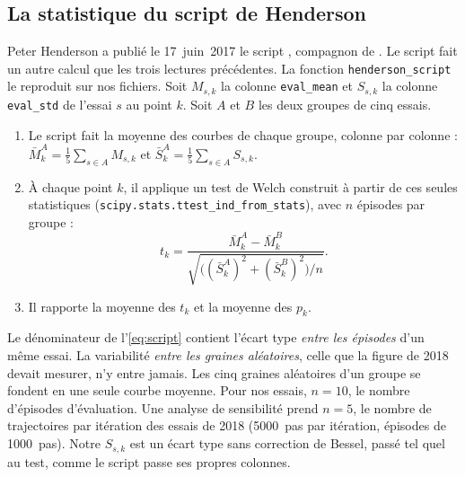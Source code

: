 \subsection{La statistique du script de Henderson}\label{sec:script-henderson}
Peter Henderson a publié le 17~juin~2017 le script 
\parencite{henderson2017samedist}, compagnon de \textcite{islam2017reproducibility}. Le script fait un autre
calcul que les trois lectures précédentes. La fonction \texttt{henderson\_script} le reproduit sur nos
fichiers. Soit $M_{s,k}$ la colonne \texttt{eval\_mean} et $S_{s,k}$ la colonne \texttt{eval\_std} de
l'essai $s$ au point $k$. Soit $A$ et $B$ les deux groupes de cinq essais.
\begin{enumerate}
  \item Le script fait la moyenne des courbes de chaque groupe, colonne par colonne :
    $\bar M^A_k=\frac15\sum_{s\in A}M_{s,k}$ et $\bar S^A_k=\frac15\sum_{s\in A}S_{s,k}$.
  \item À chaque point $k$, il applique un test de Welch construit à partir de ces seules statistiques
    (\texttt{scipy.stats.ttest\_ind\_from\_stats}), avec $n$ épisodes par groupe :
    \begin{equation}\label{eq:script}
      t_k=\frac{\bar M^A_k-\bar M^B_k}{\sqrt{\bigl((\bar S^A_k)^2+(\bar S^B_k)^2\bigr)/n}} .
    \end{equation}
  \item Il rapporte la moyenne des $t_k$ et la moyenne des $p_k$.
\end{enumerate}
Le dénominateur de l'\cref{eq:script} contient l'écart type \emph{entre les épisodes} d'un même essai. La
variabilité \emph{entre les graines aléatoires}, celle que la figure de 2018 devait mesurer, n'y entre jamais.
Les cinq graines aléatoires d'un groupe se fondent en une seule courbe moyenne. Pour nos essais, $n=10$, le nombre
d'épisodes d'évaluation. Une analyse de sensibilité prend $n=5$, le nombre de trajectoires par itération des essais de 2018
(\num{5000}~pas par itération, épisodes de \num{1000}~pas). Notre $S_{s,k}$ est un écart type sans correction
de Bessel, passé tel quel au test, comme le script passe ses propres colonnes.

